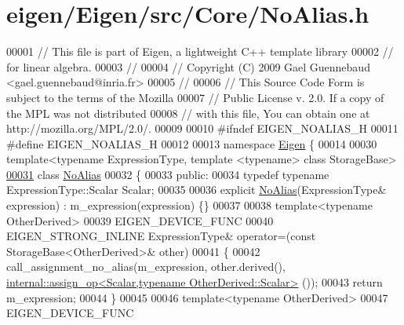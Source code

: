 \hypertarget{eigen_2_eigen_2src_2_core_2_no_alias_8h_source}{}\section{eigen/\+Eigen/src/\+Core/\+No\+Alias.h}
\label{eigen_2_eigen_2src_2_core_2_no_alias_8h_source}

\begin{DoxyCode}
00001 \textcolor{comment}{// This file is part of Eigen, a lightweight C++ template library}
00002 \textcolor{comment}{// for linear algebra.}
00003 \textcolor{comment}{//}
00004 \textcolor{comment}{// Copyright (C) 2009 Gael Guennebaud <gael.guennebaud@inria.fr>}
00005 \textcolor{comment}{//}
00006 \textcolor{comment}{// This Source Code Form is subject to the terms of the Mozilla}
00007 \textcolor{comment}{// Public License v. 2.0. If a copy of the MPL was not distributed}
00008 \textcolor{comment}{// with this file, You can obtain one at http://mozilla.org/MPL/2.0/.}
00009 
00010 \textcolor{preprocessor}{#ifndef EIGEN\_NOALIAS\_H}
00011 \textcolor{preprocessor}{#define EIGEN\_NOALIAS\_H}
00012 
00013 \textcolor{keyword}{namespace }\hyperlink{namespace_eigen}{Eigen} \{
00014 
00030 \textcolor{keyword}{template}<\textcolor{keyword}{typename} ExpressionType, \textcolor{keyword}{template} <\textcolor{keyword}{typename}> \textcolor{keyword}{class }StorageBase>
\hyperlink{group___core___module}{00031} \textcolor{keyword}{class }\hyperlink{group___core___module_class_eigen_1_1_no_alias}{NoAlias}
00032 \{
00033   \textcolor{keyword}{public}:
00034     \textcolor{keyword}{typedef} \textcolor{keyword}{typename} ExpressionType::Scalar Scalar;
00035     
00036     \textcolor{keyword}{explicit} \hyperlink{group___core___module_class_eigen_1_1_no_alias}{NoAlias}(ExpressionType& expression) : m\_expression(expression) \{\}
00037     
00038     \textcolor{keyword}{template}<\textcolor{keyword}{typename} OtherDerived>
00039     EIGEN\_DEVICE\_FUNC
00040     EIGEN\_STRONG\_INLINE ExpressionType& operator=(\textcolor{keyword}{const} StorageBase<OtherDerived>& other)
00041     \{
00042       call\_assignment\_no\_alias(m\_expression, other.derived(), 
      \hyperlink{struct_eigen_1_1internal_1_1assign__op}{internal::assign\_op<Scalar,typename OtherDerived::Scalar>}
      ());
00043       \textcolor{keywordflow}{return} m\_expression;
00044     \}
00045     
00046     \textcolor{keyword}{template}<\textcolor{keyword}{typename} OtherDerived>
00047     EIGEN\_DEVICE\_FUNC

\end{DoxyCode}
